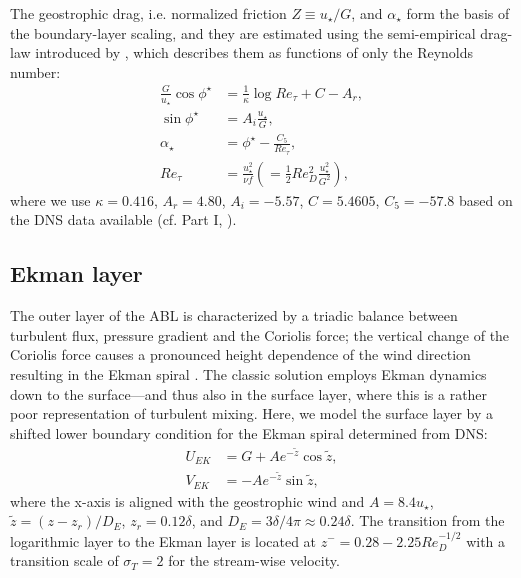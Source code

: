 \documentclass[smallcondensed,draft]{svjour3}
\begin{document}

The geostrophic drag, i.e. normalized friction $Z\equiv u_\star/G$, and $\alpha_\star$ form the basis of the boundary-layer scaling, and they are estimated using the semi-empirical drag-law introduced by \cite{spalart1989theoretical}, which describes them as functions of only the Reynolds number:
\begin{subequations}\label{eqn:drag}
	\begin{align}
		\frac{G}{u_\star}\cos\phi^\star &= \frac{1}{\kappa}\log Re_\tau + C - A_r, \\
		\sin\phi^\star &= A_i\frac{u_\star}{G},\\
		\alpha_\star &= \phi^\star - \frac{C_5}{Re_\tau},\\
		Re_\tau &= \frac{u_\star^2}{\nu f} \left( = \frac{1}{2} Re_{D}^2 \frac{u_{\star}^2}{G^2}\right),
	\end{align}
\end{subequations}
where we use $\kappa = 0.416$, $A_r = 4.80$, $A_i = -5.57$, $C = 5.4605$, $C_5 = -57.8$ based on the DNS data available (cf. Part I, \cite{ansorge2014global}).



\subsection{Ekman layer}
\label{sec:ekmanlayer}
The outer layer of the ABL is characterized by a triadic balance between turbulent flux, pressure gradient and the Coriolis force; the vertical change of the Coriolis force causes a pronounced height dependence of the wind direction resulting in the Ekman spiral \citep{ekman:AMA1905}. The classic solution employs Ekman dynamics down to the surface---and thus also in the surface layer, where this is a rather poor representation of turbulent mixing. Here, we model the surface layer by a shifted lower boundary condition for the Ekman spiral determined from DNS:
\begin{subequations}
  \begin{align}
    U_{EK} &= G + Ae^{-\tilde{z}}\cos\tilde{z},\\
		V_{EK} &= - Ae^{-\tilde{z}}\sin\tilde{z},
  \end{align}
\end{subequations}
where the x-axis is aligned with the geostrophic wind and $A = 8.4u_\star$, $\tilde{z} = (z-z_r)/D_E$, $z_r = 0.12\delta$, and $D_E = 3\delta/4\pi\approx 0.24\delta$. The transition from the logarithmic layer to the Ekman layer is located at $z^{-}=0.28- 2.25 Re_{D}^{-1/2}$ with a transition scale of $\sigma_T=2$ for the stream-wise velocity.
\end{document}
